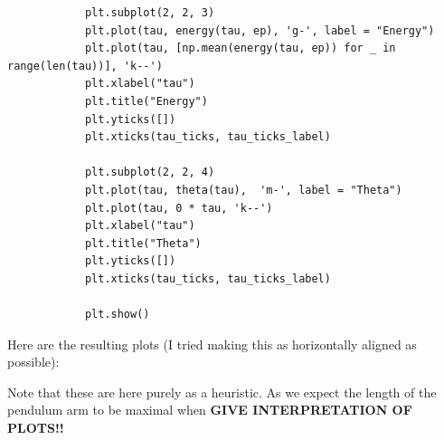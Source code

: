 \documentclass[12pt]{article}
\newcommand{\jump}{\vspace{5mm}}
\begin{document}
\begin{enumerate}[]
\begin{solution}
\begin{lstlisting}
            plt.subplot(2, 2, 3)
            plt.plot(tau, energy(tau, ep), 'g-', label = "Energy")
            plt.plot(tau, [np.mean(energy(tau, ep)) for _ in range(len(tau))], 'k--')
            plt.xlabel("tau")
            plt.title("Energy")
            plt.yticks([])  
            plt.xticks(tau_ticks, tau_ticks_label)
            
            plt.subplot(2, 2, 4)
            plt.plot(tau, theta(tau),  'm-', label = "Theta")
            plt.plot(tau, 0 * tau, 'k--')
            plt.xlabel("tau")
            plt.title("Theta")
            plt.yticks([])  
            plt.xticks(tau_ticks, tau_ticks_label)
            
            plt.show()

            \end{lstlisting}

            Here are the resulting plots (I tried making this as horizontally aligned as possible):
            
            \jump
            \centerline{\noindent}%
            \jump

            Note that these are here purely as a heuristic. As we expect the length of the pendulum arm to be maximal when
            \textbf{GIVE INTERPRETATION OF PLOTS!!}
        \end{solution}


\end{enumerate}
\end{document}
